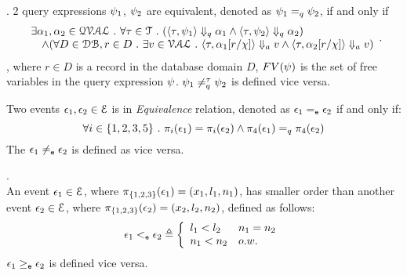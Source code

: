 %
\begin{defn}.
%
\label{def:query_equal}
2 query expressions $\psi_1$, $\psi_2$ are equivalent, denoted as $\psi_1 =_{q} \psi_2$, if and only if
$$
 \begin{array}{l} 
  \exists \alpha_1, \alpha_2 \in \mathcal{QVAL} ~.~ \forall \mathtt{\tau} \in \mathcal{T} ~.~
    (\langle \mathtt{\tau},  \psi_1 \rangle \Downarrow_q \alpha_1 \land \langle \mathtt{\tau},  \psi_2  \rangle \Downarrow_q \alpha_2) 
    \\
    \quad \land (\forall D \in \mathcal{DB}, r \in D ~.~ 
    \exists v \in \mathcal{VAL} ~.~ 
          \langle \mathtt{\tau}, \alpha_1[r/\chi] \rangle \Downarrow_a v \land \langle \mathtt{\tau},  \alpha_2[r/\chi]  \rangle \Downarrow_a v)  
  \end{array}.
$$
%
, where $r \in D$ is a record in the database domain $D$, $FV(\psi)$ is the set of free variables in the query expression $\psi$.
$\psi_1 \neq_{q}^{\mathtt{\tau}} \psi_2$  is defined vice versa.
%
\end{defn}
%
\begin{defn}
Two events $\mathtt{\epsilon}_1, \mathtt{\epsilon}_2 \in \mathcal{E}$ is in \emph{Equivalence} relation, denoted as $\mathtt{\epsilon}_1 =_{\mathtt{e}} \mathtt{\epsilon}_2$ if and only if:
\[
\forall i \in \{1, 2, 3, 5\} ~.~ \pi_{i}(\mathtt{\epsilon}_1) = \pi_{i}(\mathtt{\epsilon}_2) 
\land
\pi_{4}(\mathtt{\epsilon}_1) =_q \pi_{4}(\mathtt{\epsilon}_2)
\]
%
The $\mathtt{\epsilon}_1 \neq_{\mathtt{e}} \mathtt{\epsilon}_2$ is defined as vice versa.
\end{defn}
%
%
%
\begin{defn}.
\label{def:query_dir}
\\
An event $\mathtt{\epsilon}_1 \in \mathcal{E}$, where $\pi_{\{1, 2, 3\}}(\mathtt{\epsilon}_1) = (x_1, l_1, n_1)$,
has smaller order than another event $\mathtt{\epsilon}_2 \in \mathcal{E}$, 
where 
$ \pi_{\{1, 2, 3\}}(\mathtt{\epsilon}_2) = (x_2, l_2, n_2)$, defined as follows:
%
\[
\event_1 \eventlt \event_2
\triangleq 
\left\{
\begin{array}{ll}
  l_1 < l_2 & n_1 = n_2
  \\
  n_1 < n_2  & o.w.
\end{array}  
\right.
\]
%
$\mathtt{\epsilon}_1 \geq_{\mathtt{e}} \mathtt{\epsilon}_2$  is defined vice versa.
\end{defn}
%
%